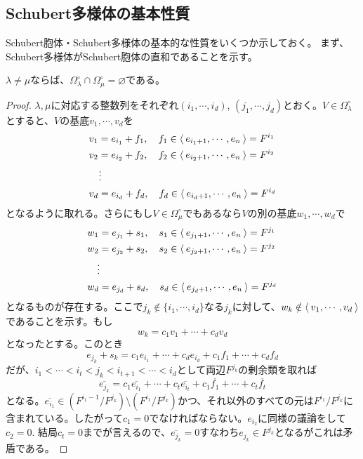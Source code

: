 \documentclass{ltjsreport}
\begin{document}
\subsection{Schubert多様体の基本性質}
Schubert胞体・Schubert多様体の基本的な性質をいくつか示しておく。
まず、Schubert多様体がSchubert胞体の直和であることを示す。

\begin{prop}
  $\lambda\neq\mu$ならば、$\Omega_\lambda^\circ\cap\Omega_\mu^\circ=\varnothing$である。
\end{prop}

\begin{proof}
  $\lambda,\mu$に対応する整数列をそれぞれ$(i_1,\cdots,i_d)$, $(j_1,\cdots,j_d)$とおく。$V\in\Omega_\lambda^\circ$とすると、$V$の基底$v_1,\cdots,v_d$を
  \begin{align*}
    &v_1=e_{i_1}+f_1,\quad f_1\in\langle\:e_{i_1+1},\cdots,e_n\:\rangle=F^{i_1}\\
    &v_2=e_{i_2}+f_2,\quad f_2\in\langle\:e_{i_2+1},\cdots,e_n\:\rangle=F^{i_2}\\
    &\quad\vdots\\
    &v_d=e_{i_d}+f_d,\quad f_d\in\langle\:e_{i_d+1},\cdots,e_n\:\rangle=F^{i_d}
  \end{align*}
  となるように取れる。さらにもし$V\in\Omega_{\mu}^\circ$でもあるなら$V$の別の基底$w_1,\cdots,w_d$で
  \begin{align*}
    &w_1=e_{j_1}+s_1,\quad s_1\in\langle\:e_{j_1+1},\cdots,e_n\:\rangle=F^{j_1}\\
    &w_2=e_{j_2}+s_2,\quad s_2\in\langle\:e_{j_2+1},\cdots,e_n\:\rangle=F^{j_2}\\
    &\quad\vdots\\
    &w_d=e_{j_d}+s_d,\quad s_d\in\langle\:e_{j_d+1},\cdots,e_n\:\rangle=F^{j_d}
  \end{align*}
  となるものが存在する。ここで$j_k\notin\{i_1,\cdots,i_d\}$なる$j_k$に対して、$w_{k}\notin\langle\:v_1,\cdots,v_d\:\rangle$であることを示す。もし
  \[
  w_k=c_1v_1+\cdots+c_dv_d  
  \]
  となったとする。このとき
  \[
  e_{j_k}+s_k=c_1e_{i_1}+\cdots+c_de_{i_d}+c_1f_1+\cdots+c_df_d  
  \]
  だが、$i_1<\cdots<i_{t}<j_k<i_{t+1}<\cdots<i_d$として両辺$F^{j_k}$の剰余類を取れば
  \[
  \overline{e_{j_k}}=c_1\overline{e_{i_1}}+\cdots+c_t\overline{e_{i_t}}+c_1\overline{f_1}+\cdots+c_t\overline{f_t}  
  \]
  となる。$\overline{e_{i_1}}\in (F^{i_1-1}/F^{j_k})\setminus (F^{i_1}/F^{j_k})$かつ、それ以外のすべての元は$F^{i_1}/F^{j_k}$に含まれている。したがって$c_1=0$でなければならない。$e_{i_2}$に同様の議論をして$c_2=0$. 結局$c_t=0$までが言えるので、$\overline{e_{j_k}}=0$すなわち$e_{j_k}\in F^{j_k}$となるがこれは矛盾である。
\end{proof}
\end{document}
